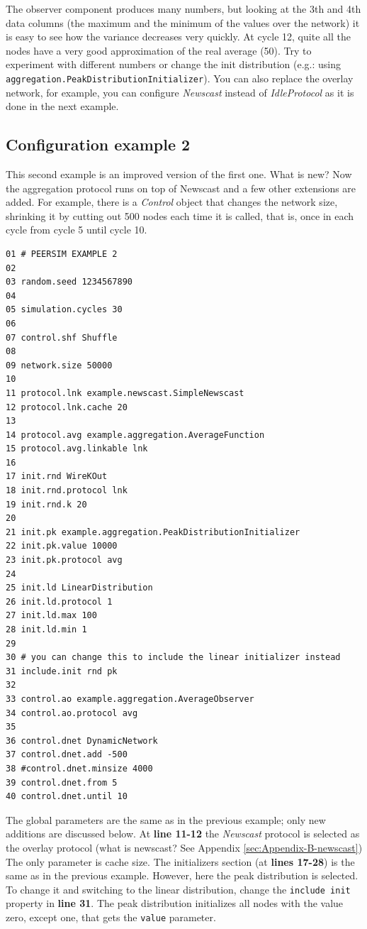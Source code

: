 \documentclass[a4paper,11pt]{article}
\begin{document}
The observer component produces many numbers, but looking at the 3th and
4th data columns (the maximum and the minimum
of the values over the network) it is easy to see how the variance
decreases very quickly.
At cycle 12, quite all the nodes have
a very good approximation of the real average (50). Try to experiment
with different numbers or change the init distribution (e.g.:
using \texttt{aggregation.PeakDistributionInitializer}).
You can also replace the overlay network, for example, you can configure
\emph{Newscast} instead of \emph{IdleProtocol} as it is done in the next
example.


\subsection{Configuration example 2}

This second example is an improved version of the first one. What is
new? Now the aggregation protocol runs on top of Newscast and a
few other extensions are added. For example, there is
a \emph{Control} object that changes the network size, shrinking it by
cutting out 500 nodes each time it is called, that is, once in each cycle
from cycle 5 until cycle 10.

\footnotesize
\begin{verbatim}
01 # PEERSIM EXAMPLE 2
02
03 random.seed 1234567890
04
05 simulation.cycles 30
06
07 control.shf Shuffle
08
09 network.size 50000
10 
11 protocol.lnk example.newscast.SimpleNewscast
12 protocol.lnk.cache 20
13
14 protocol.avg example.aggregation.AverageFunction
15 protocol.avg.linkable lnk
16
17 init.rnd WireKOut
18 init.rnd.protocol lnk
19 init.rnd.k 20
20
21 init.pk example.aggregation.PeakDistributionInitializer
22 init.pk.value 10000
23 init.pk.protocol avg
24
25 init.ld LinearDistribution
26 init.ld.protocol 1
27 init.ld.max 100
28 init.ld.min 1
29
30 # you can change this to include the linear initializer instead
31 include.init rnd pk 
32
33 control.ao example.aggregation.AverageObserver
34 control.ao.protocol avg
35
36 control.dnet DynamicNetwork
37 control.dnet.add -500
38 #control.dnet.minsize 4000
39 control.dnet.from 5
40 control.dnet.until 10
\end{verbatim}
\normalsize

The global parameters are the same as in the previous example; only
new additions are discussed below. At \textbf{line 11-12} the
\emph{Newscast} protocol is selected as the overlay protocol
(what is newscast? See Appendix \ref{sec:Appendix-B-newscast}) 
The only parameter is cache size.
The initializers section (at \textbf{lines 17-28}) is the same as in
the previous example. However, here the peak distribution is
selected. To change it and switching to the linear distribution,
change the \texttt{include init} property in \textbf{line 31}.
The
peak distribution initializes all nodes with the value zero,
except one, that gets the \texttt{value} parameter.
\end{document}
